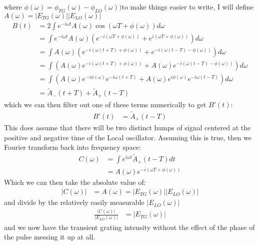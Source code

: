 where $\phi (\omega) = \phi_{TG}(\omega) - \phi_{LO}(\omega)) $to make things easier to write, I will define $A (\omega) = \left| E_{TG}(\omega)\right|  \left| E_{LO} (\omega) \right|$
\begin{align*}
	B(t)&= 2\int e^{-i \omega t} A (\omega) \cos  \left( \omega T + \phi (\omega) \right) d \omega \\
	&= \int e^{-i \omega t} A (\omega) \left( e^{ -i \left( \omega T + \phi (\omega) \right)}  + e^{ i \left( \omega T + \phi (\omega) \right)}   \right) d \omega \\
	&= \int  A (\omega) \left( e^{ -i \left( \omega (t + T) + \phi (\omega) \right)}  + e^{ -i \left( \omega (t - T) - \phi (\omega) \right)}   \right) d \omega \\
	&= \int  \left(A (\omega)  e^{ -i \left( \omega (t + T) + \phi (\omega) \right)}  + A (\omega) e^{ -i \left( \omega (t - T) - \phi (\omega) \right)}   \right) d \omega \\
	&= \int  \left(A (\omega) e^{ -i \phi (\omega)}  e^{ -i  \omega (t + T) }  + A (\omega)e^{ i \phi (\omega)}  e^{ -i  \omega (t - T) }   \right) d \omega \\
	&= \tilde{A}_- (t + T)+ \tilde{A}_+ (t -T)
\end{align*}
which we can then filter out one of these terms numerically to get $B'(t)$:
\begin{align*}
	B'(t) &=  \tilde{A}_+ (t -T)
\end{align*}
This does assume that there will be two distinct humps of signal centered at the positive and negative time of the Local oscillator.  Assuming this is true, then we Fourier transform back into frequency space:
\begin{align*}
	C(\omega) &= \int e^{i \omega t} \tilde{A}_+ (t -T)dt \\
	&= A (\omega) e^{ -i \left( \omega T+ \phi (\omega) \right)}
\end{align*}
Which we can then take the absolute value of:
\begin{align*}
	| C(\omega) | &= A (\omega) = \left| E_{TG}(\omega)\right|  \left| E_{LO} (\omega) \right|
\end{align*}
and divide by the relatively easily measurable $\left| E_{LO} (\omega) \right|$
\begin{align*}
	\frac{| C(\omega) |}{  \left| E_{LO} (\omega) \right| } &=  \left| E_{TG}(\omega)\right|
\end{align*}
and we now have the transient grating intensity without the effect of the phase of the pulse messing it up at all.

